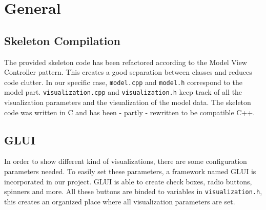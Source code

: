 \section{General}

	\subsection{Skeleton Compilation}
    The provided skeleton code has been refactored according to the Model View Controller pattern. This creates a good separation between classes and reduces code clutter.
    In our specific case, \texttt{model.cpp} and \texttt{model.h} correspond to the model part. \texttt{visualization.cpp} and \texttt{visualization.h} keep track of all the visualization parameters and the visualization of the model data.
    The skeleton code was written in C and has been - partly - rewritten to be compatible C++.

    \subsection{GLUI}
        In order to show different kind of visualizations, there are some configuration parameters needed.
        To easily set these parameters, a framework named GLUI \cite{glui} is incorporated in our project.
        GLUI is able to create check boxes, radio buttons, spinners and more.
        All these buttons are binded to variables in \texttt{visualization.h}, this creates an organized place where all visualization parameters are set.